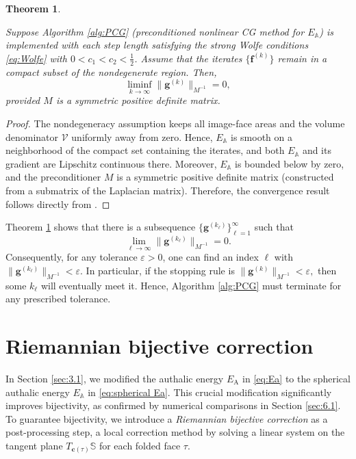 \documentclass{article}
\numberwithin{equation}{section}
\newtheorem{theorem}{Theorem}
\def\c{\mathbf{c}}
\def\f{\mathbf{f}}
\def\g{\mathbf{g}}
\def\rA{\mathrm{A}}
\def\bbA{\mathbb{A}}
\def\bV{\mathscr{V}}
\begin{document}
\begin{theorem} \label{thm:convergence}

Suppose Algorithm \ref{alg:PCG} (preconditioned nonlinear CG method for $E_\bbA$) is implemented with each step length satisfying the strong Wolfe conditions \eqref{eq:Wolfe} with $0<c_1<c_2<\frac{1}{2}$. Assume that the iterates $\{\f^{(k)}\}$ remain in a compact subset of the nondegenerate region. Then,
\[
\liminf_{k \rightarrow \infty} \| \g^{(k)} \|_{M^{-1}} = 0,
\]
{ 
provided $M$ is a symmetric positive definite matrix.
}
\end{theorem}
\begin{proof}
{  The nondegeneracy assumption keeps all image-face areas and the volume denominator $\bV$ uniformly away from zero. Hence, $E_\bbA$ is smooth on a neighborhood of the compact set containing the iterates, and both $E_\bbA$ and its gradient are Lipschitz continuous there. Moreover, $E_\bbA$ is bounded below by zero, and the preconditioner $M$ is a symmetric positive definite matrix (constructed from a submatrix of the Laplacian matrix). Therefore, the convergence result follows directly from \cite[Appendix A]{LiYu24}.}

\end{proof}

Theorem \ref{thm:convergence} shows that there is a subsequence $\{\g^{(k_\ell)}\}_{\ell=1}^\infty$ such that
$$
\lim_{\ell\to\infty} \|\g^{(k_\ell)}\|_{M^{-1}} = 0.
$$
Consequently, for any tolerance $\varepsilon>0$, one can find an index $\ell$ with $\| \g^{(k_\ell)} \|_{M^{-1}}<\varepsilon$. In particular, if the stopping rule is
$
\|\g^{(k)}\|_{M^{-1}} < \varepsilon,
$
then some $k_\ell$ will eventually meet it. Hence, Algorithm \ref{alg:PCG} must terminate for any prescribed tolerance.

\section{Riemannian bijective correction}
\label{sec:5}
In Section \ref{sec:3.1}, we { modified} the authalic energy $E_\rA$ in \eqref{eq:Ea} to the spherical authalic energy $E_\bbA$ in \eqref{eq:spherical Ea}. This crucial modification significantly improves bijectivity, as confirmed by numerical comparisons in Section \ref{sec:6.1}. 
To guarantee bijectivity, we introduce a { \em Riemannian bijective correction} as a post-processing step, a local correction method by solving a linear system on the tangent plane $T_{\c(\tau)}\mathbb{S}$ for each folded face $\tau$.
\end{document}

